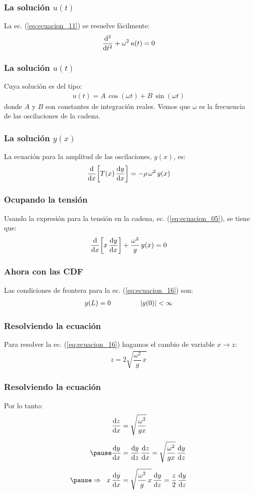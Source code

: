 \documentclass[12pt]{beamer}
\begin{document}
\begin{frame}
\frametitle{La solución $u (t)$}
La ec. (\ref{eq:ecuacion_11}) se resuelve fácilmente:
\pause
\begin{align}
\dv[2]{t} + \omega^{2} \, u (t) = 0
\label{eq:ecuacion_13}
\end{align}
\end{frame}
\begin{frame}
\frametitle{La solución $u (t)$}
Cuya solución es del tipo:
\pause
\begin{align}
u (t) = A \, \cos (\omega t) + B \, \sin (\omega t)
\label{eq:ecuacion_14}
\end{align}
\pause
donde $A$ y $B$ son constantes de integración reales. \pause Vemos que $\omega$ es la frecuencia de las oscilaciones de la cadena.
\end{frame}
\begin{frame}
\frametitle{La solución $y (x)$}
La ecuación para la amplitud de las oscilaciones, $y (x)$, es:
\pause
\begin{align}
\dv{x} \bigg[ T (x) \, \dv{y}{x} \bigg] = - \rho \, \omega^{2} \, y (x)
\label{eq:ecuacion_15}
\end{align}
\end{frame}
\begin{frame}
\frametitle{Ocupando la tensión}
Usando la expresión para la tensión en la cadena, ec. (\ref{eq:ecuacion_05}), se tiene que:
\pause
\begin{align}
\dv{x} \bigg[ x \, \dv{y}{x} \bigg] + \dfrac{\omega^{2}}{g} \, y(x) = 0
\label{eq:ecuacion_16}
\end{align}
\end{frame}
\begin{frame}
\frametitle{Ahora con las CDF}
Las condiciones de frontera para la ec. (\ref{eq:ecuacion_16}) son:
\pause
\begin{align}
y (L) = 0 \hspace{1.5cm} \abs{y (0)} < \infty
\label{eq:ecuacion_17}
\end{align}
\end{frame}
\begin{frame}
\frametitle{Resolviendo la ecuación}
Para resolver la ec. (\ref{eq:ecuacion_16}) hagamos el cambio de variable $x \to z$:
\pause
\begin{align}
z = 2 \sqrt{\dfrac{\omega^{2}}{g} \, x}
\label{eq:ecuacion_18}
\end{align}
\end{frame}
\begin{frame}
\frametitle{Resolviendo la ecuación}
Por lo tanto:
\pause
\begin{eqnarray}
\begin{aligned}[b]
\dv{z}{x} &= \sqrt{\dfrac{\omega^{2}}{g x}} \\[0.5em] \pause
\dv{y}{x} &= \dv{y}{z} \, \dv{z}{x} = \sqrt{\dfrac{\omega^{2}}{g x}} \, \dv{y}{z} \\[0.5em] \pause
\Rightarrow \hspace{0.2cm} x \, \dv{y}{x} &= \sqrt{\dfrac{\omega^{2}}{g} \, x} \, \dv{y}{z} = \dfrac{z}{2} \, \dv{y}{z}
\end{aligned}
\label{eq:ecuacion_19}
\end{eqnarray}
\end{frame}
\end{document}
